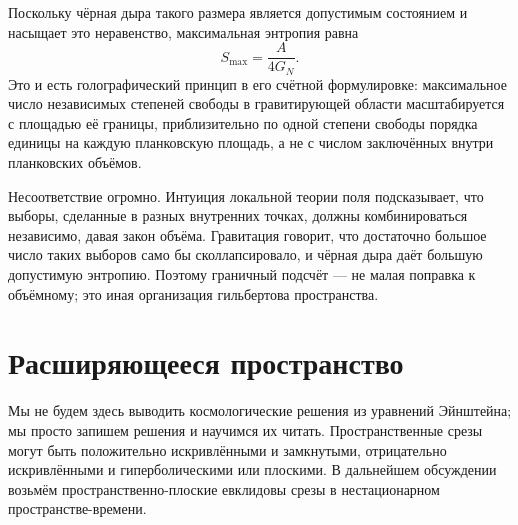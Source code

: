 Поскольку чёрная дыра такого размера является допустимым состоянием и насыщает это неравенство, максимальная энтропия равна
\begin{equation}
S_{\max}=\frac{A}{4G_N}.
\label{eq:l07-holographic-maximum}
\end{equation}
Это и есть голографический принцип в его счётной формулировке: максимальное число независимых степеней свободы в гравитирующей области масштабируется с площадью её границы, приблизительно по одной степени свободы порядка единицы на каждую планковскую площадь, а не с числом заключённых внутри планковских объёмов.

Несоответствие огромно. Интуиция локальной теории поля подсказывает, что выборы, сделанные в разных внутренних точках, должны комбинироваться независимо, давая закон объёма. Гравитация говорит, что достаточно большое число таких выборов само бы сколлапсировало, и чёрная дыра даёт большую допустимую энтропию. Поэтому граничный подсчёт — не малая поправка к объёмному; это иная организация гильбертова пространства.

\begin{classroomqa}
\end{classroomqa}

\begin{classroomqa}
\end{classroomqa}

\section{Расширяющееся пространство}

Мы не будем здесь выводить космологические решения из уравнений Эйнштейна; мы просто запишем решения и научимся их читать. Пространственные срезы могут быть положительно искривлёнными и замкнутыми, отрицательно искривлёнными и гиперболическими или плоскими. В дальнейшем обсуждении возьмём пространственно-плоские евклидовы срезы в нестационарном пространстве-времени.

